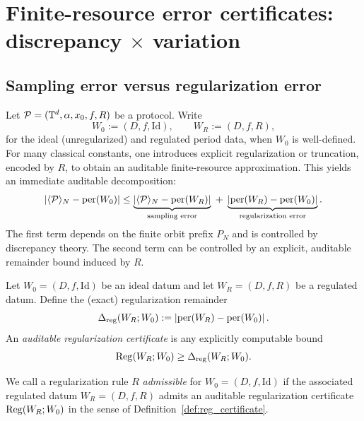 
\section{Finite-resource error certificates: discrepancy \texorpdfstring{$\times$}{x} variation}
\label{sec:error_certificates}

\subsection{Sampling error versus regularization error}
\label{sec:error_decomposition}

Let $\mathcal{P}=(\mathbb{T}^d,\alpha,x_0,f,R)$ be a protocol.
Write
\[
W_0:=(D,f,\mathrm{Id}),\qquad W_R:=(D,f,R),
\]
for the ideal (unregularized) and regulated period data, when $W_0$ is well-defined.
For many classical constants, one introduces explicit regularization or truncation, encoded by $R$, to obtain an auditable finite-resource approximation.
This yields an immediate auditable decomposition:
\begin{equation}
\label{eq:error_decomposition}
\left|\langle \mathcal{P} \rangle_N-\mathrm{per}(W_0)\right|
\le
\underbrace{\left|\langle \mathcal{P} \rangle_N-\mathrm{per}(W_R)\right|}_{\text{sampling error}}
\;+\;
\underbrace{\left|\mathrm{per}(W_R)-\mathrm{per}(W_0)\right|}_{\text{regularization error}}.
\end{equation}
The first term depends on the finite orbit prefix $P_N$ and is controlled by discrepancy theory.
The second term can be controlled by an explicit, auditable remainder bound induced by $R$.

\begin{definition}
\label{def:reg_certificate}
Let $W_0=(D,f,\mathrm{Id})$ be an ideal datum and let $W_R=(D,f,R)$ be a regulated datum.
Define the (exact) regularization remainder
\[
\Delta_{\mathrm{reg}}(W_R;W_0):=\left|\mathrm{per}(W_R)-\mathrm{per}(W_0)\right|.
\]
An \emph{auditable regularization certificate} is any explicitly computable bound
\[
\mathrm{Reg}(W_R;W_0)\ge \Delta_{\mathrm{reg}}(W_R;W_0).
\]
\end{definition}

\begin{definition}
\label{def:admissible_regularization}
We call a regularization rule $R$ \emph{admissible} for $W_0=(D,f,\mathrm{Id})$ if the associated regulated datum $W_R=(D,f,R)$ admits an auditable regularization certificate $\mathrm{Reg}(W_R;W_0)$ in the sense of Definition~\ref{def:reg_certificate}.
\end{definition}

